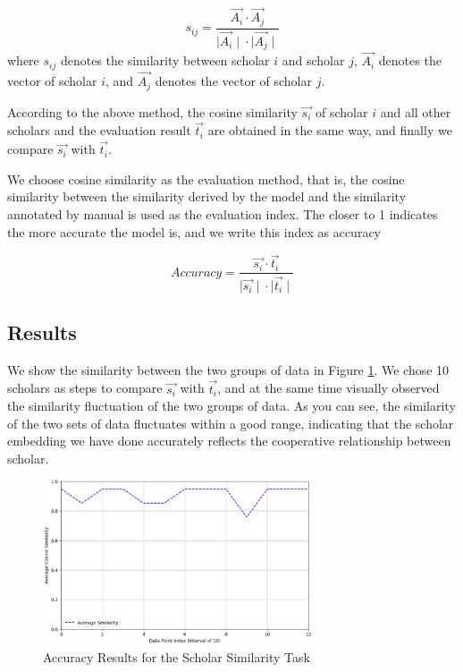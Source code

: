 \documentclass[conference]{IEEEtran}
\begin{document}
\begin{equation}\label{eq:s}
    s_{ij} = \frac{\vec{A_i} \cdot \vec{A_j}}{{\mid \vec{A_i} \mid} \cdot {\mid \vec{A_j} \mid}}
\end{equation}
where \(s_{ij}\) denotes the similarity between scholar \(i\) and
scholar \(j\), \(\vec{A_i}\) denotes the vector of scholar \(i\), and
\(\vec{A_j}\) denotes the vector of scholar \(j\).

According to the above method, the cosine similarity \(\vec{s_i}\) of
scholar \(i\) and all other scholars and the evaluation result
\(\vec{t_{i}}\) are obtained in the same way, and finally we compare
\(\vec{s_i}\) with \(\vec{t_i}\).

We choose cosine similarity as the evaluation method, that is, the cosine similarity between the similarity derived by the model and the similarity annotated by manual is used as the evaluation index. The closer to 1 indicates the more accurate the model is, and we write this index as accuracy

\begin{equation}\label{eq:Accuracy}
    Accuracy = \frac{\vec{s_i} \cdot \vec{t_{i}}}{{\mid \vec{s_i} \mid} \cdot {\mid \vec{t_{i}} \mid}}
\end{equation}

\subsection{Results}
We show the similarity between the two groups of data in Figure \ref{Accuracy}. We chose 10 scholars as steps to compare \(\vec{s_i}\) with \(\vec{t_i}\), and at the same time visually observed the similarity fluctuation of the two groups of data. As you can see, the similarity of the two sets of data fluctuates within a good range, indicating that the scholar embedding we have done accurately reflects the cooperative relationship between scholar.

\begin{figure}[htbp] %
\centering %
\includegraphics[width=8cm]{img/image.png}
\caption{Accuracy Results for the Scholar Similarity Task} %
\label{Accuracy} %
\end{figure}
\end{document}
